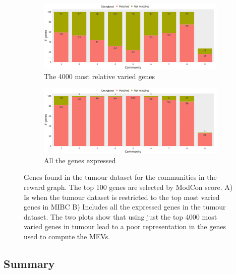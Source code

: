 \begin{figure}[!htb]
    \centering
    \begin{subfigure}[b]{1.0\textwidth}
        \includegraphics[width=\textwidth,keepaspectratio]{Sections/Network_I/Resources/P0/4K_p0_modConMev_rep_norm3_4K_50TF_v3.png}
        \caption{The 4000 most relative varied genes}
        \label{fig:N_I:p0_mev_sel_rep}
    \end{subfigure}
    \begin{subfigure}[b]{1.0\textwidth}
        \centering
        \includegraphics[width=\textwidth,keepaspectratio]{Sections/Network_I/Resources/P0/13K_p0_modConMev_rep_norm3_4K_50TF_v3.png}
        \caption{All the genes expressed}
        \label{fig:N_I:p0_mev_all_rep}
    \end{subfigure}
    \caption[Gene representation in MEV]{Genes found in the tumour dataset for the communities in the reward graph. The top 100 genes are selected by ModCon score. A) Is when the tumour dataset is restricted to the top most varied genes in MIBC B) Includes all the expressed genes in the tumour dataset. The two plots show that using just the top 4000 most varied genes in tumour lead to a poor representation in the genes used to compute the MEVs.}
    \label{fig:N_I:p0_mev_rep}
\end{figure}



\subsection{Summary}

